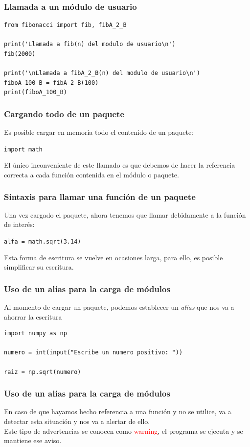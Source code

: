 \begin{frame}[fragile]
\frametitle{Llamada a un módulo de usuario}
\begin{lstlisting}[style=codigopython]
from fibonacci import fib, fibA_2_B

print('Llamada a fib(n) del modulo de usuario\n')
fib(2000)

print('\nLlamada a fibA_2_B(n) del modulo de usuario\n')
fiboA_100_B = fibA_2_B(100)
print(fiboA_100_B)
\end{lstlisting}
\end{frame}
\begin{frame}[fragile]
\frametitle{Cargando todo de un paquete}
Es posible cargar en memoria todo el contenido de un paquete:
\begin{center}
\verb|import math|
\end{center}
\pause
El único inconveniente de este llamado es que debemos de hacer la referencia correcta a cada función contenida en el módulo o paquete.
\end{frame}
\begin{frame}[fragile]
\frametitle{Sintaxis para llamar una función de un paquete}
Una vez cargado el paquete, ahora tenemos que llamar debidamente a la función de interés:
\begin{center}
\verb|alfa = math.sqrt(3.14)|
\end{center}
\pause
Esta forma de escritura se vuelve en ocasiones larga, para ello, es posible simplificar su escritura.
\end{frame}
\begin{frame}[fragile]
\frametitle{Uso de un alias para la carga de módulos}
Al momento de cargar un paquete, podemos establecer un \emph{alias} que nos va a ahorrar la escritura
\begin{lstlisting}[style=codigopython]
import numpy as np

numero = int(input("Escribe un numero positivo: "))

raiz = np.sqrt(numero)
\end{lstlisting}
\end{frame}
\begin{frame}[fragile]
\frametitle{Uso de un alias para la carga de módulos}
En caso de que hayamos hecho referencia a una función y no se utilice,  va a detectar esta situación y nos va a alertar de ello.
\\
\bigskip
Este tipo de advertencias se conocen como \textcolor{red}{warning}, el programa se ejecuta y se mantiene ese aviso.
\end{frame}
